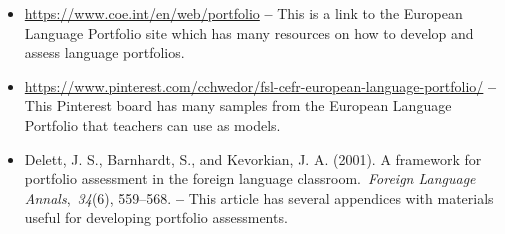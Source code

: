 \documentclass[output=paper]{langscibook}
\begin{document}
\begin{itemize}
\item \url{https://www.coe.int/en/web/portfolio} \textbf{--} This is a link to the European Language Portfolio site which has many resources on how to develop and assess language portfolios.
\item \begin{sloppypar}\url{https://www.pinterest.com/cchwedor/fsl-cefr-european-language-portfolio/} \textbf{--} This Pinterest board has many samples from the European Language Portfolio that teachers can use as models.\end{sloppypar}
\item Delett, J. S., Barnhardt, S., and Kevorkian, J. A. (2001). A framework for portfolio assessment in the foreign language classroom.~\textit{Foreign Language Annals},~\textit{34}(6), 559--568. \textbf{--} This article has several appendices with materials useful for developing portfolio assessments.
\end{itemize}
\sloppy
\printbibliography[heading=subbibliography,notkeyword=this]
\end{document}
